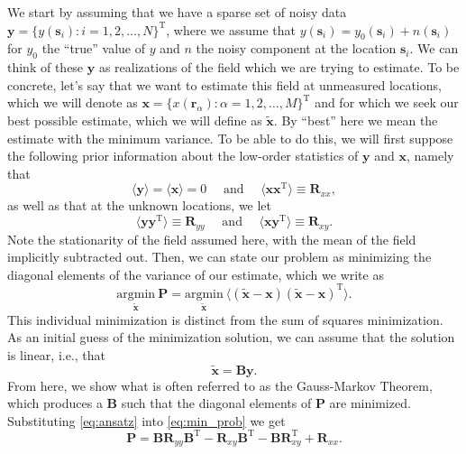 \documentclass[12pt]{article}
\begin{document}
We start by assuming that we have a sparse set of noisy data $\bm{y} = \{y\left(\bm{s}_i\right) : i = 1, 2, \ldots, N\}^{\textrm{T}}$, where we assume that $y\left(\bm{s}_i\right) = y_0\left(\bm{s}_i\right) + n\left(\bm{s}_i\right)$ for $y_0$ the ``true'' value of $y$ and $n$ the noisy component at the location $\bm{s}_i$. 
We can think of these $\bm{y}$ as realizations of the field which we are trying to estimate. 
To be concrete, let's say that we want to estimate this field at unmeasured locations, which we will denote as $\bm{x} = \{x\left(\bm{r}_{\alpha}\right) : \alpha = 1, 2, \ldots, M\}^{\textrm{T}}$ and for which we seek our best possible estimate, which we will define as $\bm{\tilde{x}}$.
By ``best'' here we mean the estimate with the minimum variance. To be able to do this, we will first suppose the following prior information about the low-order statistics of $\bm{y}$ and $\bm{x}$, namely that
\[
	\langle\bm{y}\rangle = \langle \bm{x}\rangle = 0 \quad \textrm{ and } \quad \langle \bm{x}\bm{x}^{\textrm{T}}\rangle \equiv \bm{R}_{xx},
\]
as well as that at the unknown locations, we let
\[
	\langle \bm{y}\bm{y}^{\textrm{T}}\rangle \equiv \bm{R}_{yy} \quad \textrm{ and } \quad \langle\bm{x}\bm{y}^{\textrm{T}}\rangle \equiv \bm{R}_{xy}.
\]
Note the stationarity of the field assumed here, with the mean of the field implicitly subtracted out.
Then, we can state our problem as minimizing the diagonal elements of the variance of our estimate, which we write as
\begin{equation}
	\underset{\bm{\tilde{x}}}{\textrm{argmin}}\:\bm{P} = \underset{\bm{\tilde{x}}}{\textrm{argmin}}\:\langle\left(\bm{\tilde{x}} - \bm{x}\right)\left(\bm{\tilde{x}} - \bm{x}\right)^{\textrm{T}}\rangle.
	\label{eq:min_prob}
\end{equation}
This individual minimization is distinct from the sum of squares minimization.
As an initial guess of the minimization solution, we can assume that the solution is linear, i.e., that 
\begin{equation}
	\bm{\tilde{x}} = \bm{B}\bm{y}.
	\label{eq:ansatz}
\end{equation}
From here, we show what is often referred to as the Gauss-Markov Theorem, which produces a $\bm{B}$ such that the diagonal elements of $\bm{P}$ are minimized.
Substituting \eqref{eq:ansatz} into \eqref{eq:min_prob} we get
\begin{equation}
	\bm{P} = \bm{B}\bm{R}_{yy}\bm{B}^{\textrm{T}} - \bm{R}_{xy}\bm{B}^{\textrm{T}} - \bm{B}\bm{R}_{xy}^{\textrm{T}} + \bm{R}_{xx}.
	\label{eq:p_min_1}
\end{equation}
\end{document}

